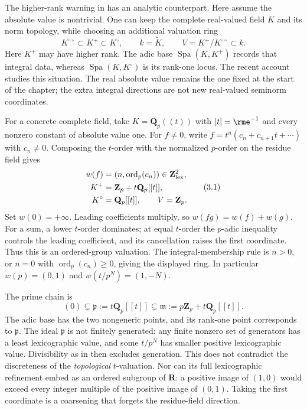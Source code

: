 The higher-rank warning in
 has an analytic counterpart.
Here assume the absolute value is nontrivial. One can keep the complete
real-valued field $K$ and its norm topology, while choosing an additional
valuation ring
\[
 K^{\circ\circ}\subset K^+\subset K^\circ,\qquad
 k=\widetilde K,\qquad V=K^+/K^{\circ\circ}\subset k.
\]
Here $K^+$ may have higher rank. The adic base
$\operatorname{Spa}(K,K^+)$ records that integral data, whereas
$\operatorname{Spa}(K,K^\circ)$ is its rank-one locus.
The recent account \cite{KaibWerner26HigherRankV1} studies this situation.
The real absolute value remains the one fixed at the start of the chapter;
the extra integral directions are not new real-valued seminorm coordinates.

For a concrete complete field, take $K=\mathbf Q_p((t))$ with
$|t|=\rme^{-1}$ and every nonzero constant of absolute value one.
For $f\ne0$, write $f=t^n(c_n+c_{n+1}t+\cdots)$ with
$c_n\ne0$. Composing the $t$-order with the normalized $p$-order on
the residue field gives
\begin{equation}
 \begin{aligned}
 w(f)&=(n,\operatorname{ord}_p(c_n))\in\mathbf Z^2_{\rm lex},\\
 K^+&=\mathbf Z_p+t\mathbf Q_p[[t]],\\
 K^\circ&=\mathbf Q_p[[t]],\qquad V=\mathbf Z_p.
 \end{aligned}
 \tag{3.1}\label{eq:models-composed-valuation}
\end{equation}
Set $w(0)=+\infty$. Leading coefficients multiply, so $w(fg)=w(f)+w(g)$.
For a sum, a lower $t$-order dominates; at equal $t$-order the
$p$-adic inequality controls the leading coefficient, and its cancellation
raises the first coordinate. Thus this is an ordered-group valuation.
The integral-membership rule is $n>0$, or $n=0$ with
$\operatorname{ord}_p(c_n)\geq0$, giving the displayed ring.
In particular $w(p)=(0,1)$ and $w(t/p^N)=(1,-N)$.

The prime chain is
\[
 (0)\subsetneq\mathfrak p:=t\mathbf Q_p[[t]]
 \subsetneq\mathfrak m:=p\mathbf Z_p+t\mathbf Q_p[[t]].
\]
The adic base has the two nongeneric points, and its rank-one point
corresponds to $\mathfrak p$. The ideal $\mathfrak p$ is not finitely
generated: any finite nonzero set of generators has a least
lexicographic value, and some $t/p^N$ has smaller positive lexicographic
value. Divisibility as in 
then excludes generation. This does not contradict the discreteness of
the \emph{topological} $t$-valuation. Nor can its full lexicographic
refinement embed as an ordered subgroup of $\mathbf R$: a positive
image of $(1,0)$ would exceed every integer multiple of the positive
image of $(0,1)$. Taking the first coordinate is a coarsening that
forgets the residue-field direction.

